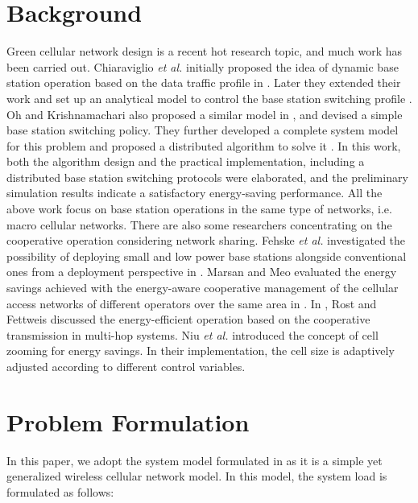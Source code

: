\documentclass[conference]{IEEEtran}
\begin{document}
\section{Background}\label{sec:background}
Green cellular network design is a recent hot research topic, and much work has been carried out. Chiaraviglio \textit{et al.} initially proposed the idea of dynamic base station operation based on the data traffic profile in \cite{ChiaraviglioCiulloMeoMarsan2009Energyefficientmanagement}. Later they extended their work and set up an analytical model to control the base station switching profile \cite{MarsanChiaraviglioCiulloMeo2009OptimalEnergySavings}. Oh and Krishnamachari also proposed a similar model in \cite{OhKrishnamachari2010EnergySavingsthrough}, and devised a simple base station switching policy. They further developed a complete system model for this problem and proposed a distributed algorithm to solve it \cite{OhSonKrishnamachari2013DynamicBaseStation}. In this work, both the algorithm design and the practical implementation, including a distributed base station switching protocols were elaborated, and the preliminary simulation results indicate a satisfactory energy-saving performance. All the above work focus on base station operations in the same type of networks, i.e. macro cellular networks. There are also some researchers concentrating on the cooperative operation considering network sharing. Fehske \textit{et al.} investigated the possibility of deploying small and low power base stations alongside conventional ones from a deployment perspective in \cite{FehskeRichterFettweis2009EnergyEfficiencyImprovements}. Marsan and Meo evaluated the energy savings achieved with the energy-aware cooperative management of the cellular access networks of different operators over the same area in \cite{MarsanMeo2010Energyefficientmanagement}. In \cite{RostFettweis2010TransmissionComputationEnergy}, Rost and Fettweis discussed the energy-efficient operation based on the cooperative transmission in multi-hop systems. Niu \textit{et al.} introduced the concept of cell zooming for energy savings. In their implementation, the cell size is adaptively adjusted according to different control variables.

\section{Problem Formulation}\label{sec:formulation}
In this paper, we adopt the system model formulated in \cite{OhSonKrishnamachari2013DynamicBaseStation} as it is a simple yet generalized wireless cellular network model. In this model, the system load is formulated as follows:
\end{document}
